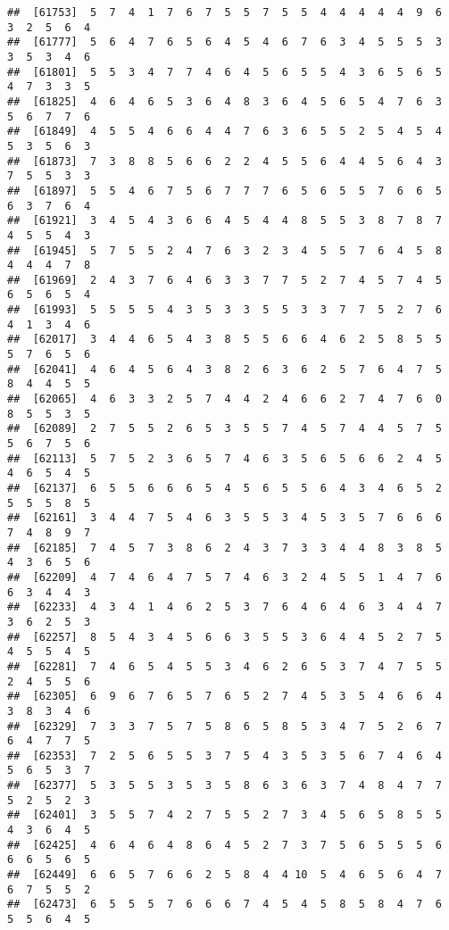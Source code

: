 \documentclass[
]{book}
\begin{document}
\begin{verbatim}
##  [61753]  5  7  4  1  7  6  7  5  5  7  5  5  4  4  4  4  4  9  6  3  2  5  6  4
##  [61777]  5  6  4  7  6  5  6  4  5  4  6  7  6  3  4  5  5  5  3  3  5  3  4  6
##  [61801]  5  5  3  4  7  7  4  6  4  5  6  5  5  4  3  6  5  6  5  4  7  3  3  5
##  [61825]  4  6  4  6  5  3  6  4  8  3  6  4  5  6  5  4  7  6  3  5  6  7  7  6
##  [61849]  4  5  5  4  6  6  4  4  7  6  3  6  5  5  2  5  4  5  4  5  3  5  6  3
##  [61873]  7  3  8  8  5  6  6  2  2  4  5  5  6  4  4  5  6  4  3  7  5  5  3  3
##  [61897]  5  5  4  6  7  5  6  7  7  7  6  5  6  5  5  7  6  6  5  6  3  7  6  4
##  [61921]  3  4  5  4  3  6  6  4  5  4  4  8  5  5  3  8  7  8  7  4  5  5  4  3
##  [61945]  5  7  5  5  2  4  7  6  3  2  3  4  5  5  7  6  4  5  8  4  4  4  7  8
##  [61969]  2  4  3  7  6  4  6  3  3  7  7  5  2  7  4  5  7  4  5  6  5  6  5  4
##  [61993]  5  5  5  5  4  3  5  3  3  5  5  3  3  7  7  5  2  7  6  4  1  3  4  6
##  [62017]  3  4  4  6  5  4  3  8  5  5  6  6  4  6  2  5  8  5  5  5  7  6  5  6
##  [62041]  4  6  4  5  6  4  3  8  2  6  3  6  2  5  7  6  4  7  5  8  4  4  5  5
##  [62065]  4  6  3  3  2  5  7  4  4  2  4  6  6  2  7  4  7  6  0  8  5  5  3  5
##  [62089]  2  7  5  5  2  6  5  3  5  5  7  4  5  7  4  4  5  7  5  5  6  7  5  6
##  [62113]  5  7  5  2  3  6  5  7  4  6  3  5  6  5  6  6  2  4  5  4  6  5  4  5
##  [62137]  6  5  5  6  6  6  5  4  5  6  5  5  6  4  3  4  6  5  2  5  5  5  8  5
##  [62161]  3  4  4  7  5  4  6  3  5  5  3  4  5  3  5  7  6  6  6  7  4  8  9  7
##  [62185]  7  4  5  7  3  8  6  2  4  3  7  3  3  4  4  8  3  8  5  4  3  6  5  6
##  [62209]  4  7  4  6  4  7  5  7  4  6  3  2  4  5  5  1  4  7  6  6  3  4  4  3
##  [62233]  4  3  4  1  4  6  2  5  3  7  6  4  6  4  6  3  4  4  7  3  6  2  5  3
##  [62257]  8  5  4  3  4  5  6  6  3  5  5  3  6  4  4  5  2  7  5  4  5  5  4  5
##  [62281]  7  4  6  5  4  5  5  3  4  6  2  6  5  3  7  4  7  5  5  2  4  5  5  6
##  [62305]  6  9  6  7  6  5  7  6  5  2  7  4  5  3  5  4  6  6  4  3  8  3  4  6
##  [62329]  7  3  3  7  5  7  5  8  6  5  8  5  3  4  7  5  2  6  7  6  4  7  7  5
##  [62353]  7  2  5  6  5  5  3  7  5  4  3  5  3  5  6  7  4  6  4  5  6  5  3  7
##  [62377]  5  3  5  5  3  5  3  5  8  6  3  6  3  7  4  8  4  7  7  5  2  5  2  3
##  [62401]  3  5  5  7  4  2  7  5  5  2  7  3  4  5  6  5  8  5  5  4  3  6  4  5
##  [62425]  4  6  4  6  4  8  6  4  5  2  7  3  7  5  6  5  5  5  6  6  6  5  6  5
##  [62449]  6  6  5  7  6  6  2  5  8  4  4 10  5  4  6  5  6  4  7  6  7  5  5  2
##  [62473]  6  5  5  5  7  6  6  6  7  4  5  4  5  8  5  8  4  7  6  5  5  6  4  5

\end{verbatim}
\end{document}
